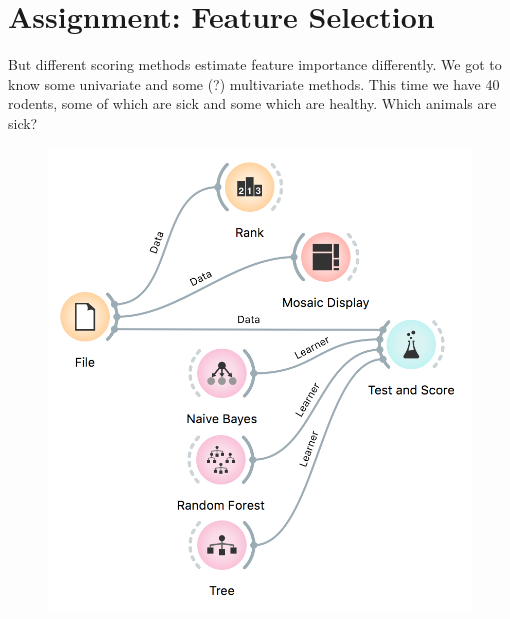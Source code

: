 \chapter{Assignment: Feature Selection}
\label{hw:feature-selection}

 But different scoring methods estimate feature importance differently. We got to know some univariate and some (?) multivariate methods. This time we have 40 rodents, some of which are sick and some which are healthy. Which animals are sick?


\begin{figure}[h]
  \centering
  \includegraphics[scale=0.7]{feature-selection-workflow.png}%
  \caption{$\;$}
  \label{fig:wf1}
\end{figure}

